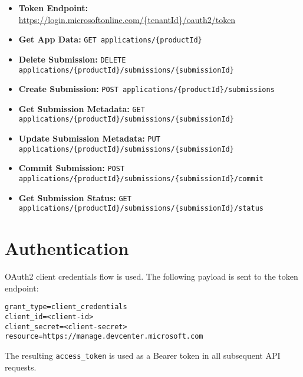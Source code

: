 \documentclass{article}
\begin{document}
\begin{itemize}
    \item \textbf{Token Endpoint:} \url{https://login.microsoftonline.com/\{tenantId\}/oauth2/token}
    \item \textbf{Get App Data:} \texttt{GET applications/\{productId\}}
    \item \textbf{Delete Submission:} \texttt{DELETE applications/\{productId\}/submissions/\{submissionId\}}
    \item \textbf{Create Submission:} \texttt{POST applications/\{productId\}/submissions}
    \item \textbf{Get Submission Metadata:} \texttt{GET applications/\{productId\}/submissions/\{submissionId\}}
    \item \textbf{Update Submission Metadata:} \texttt{PUT applications/\{productId\}/submissions/\{submissionId\}}
    \item \textbf{Commit Submission:} \texttt{POST applications/\{productId\}/submissions/\{submissionId\}/commit}
    \item \textbf{Get Submission Status:} \texttt{GET applications/\{productId\}/submissions/\{submissionId\}/status}
\end{itemize}

\section{Authentication}
OAuth2 client credentials flow is used. The following payload is sent to the token endpoint:
\begin{verbatim}
grant_type=client_credentials
client_id=<client-id>
client_secret=<client-secret>
resource=https://manage.devcenter.microsoft.com
\end{verbatim}
The resulting \texttt{access\_token} is used as a Bearer token in all subsequent API requests.
\end{document}
